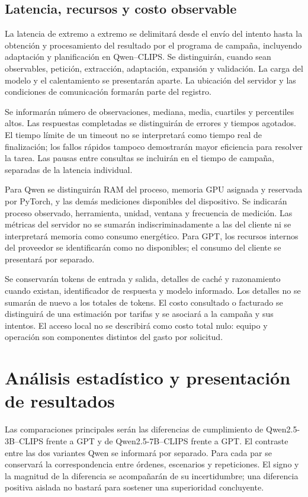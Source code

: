 \subsection{Latencia, recursos y costo observable}
\label{sec:rendimiento_cap6}

La latencia de extremo a extremo se delimitará desde el envío del intento
hasta la obtención y procesamiento del resultado por el programa de campaña,
incluyendo adaptación y planificación en Qwen--CLIPS. Se distinguirán,
cuando sean observables, petición, extracción, adaptación, expansión y
validación. La carga del modelo y el calentamiento se presentarán aparte.
La ubicación del servidor y las condiciones de comunicación formarán parte
del registro.

Se informarán número de observaciones, mediana, media, cuartiles y
percentiles altos. Las respuestas completadas se distinguirán de errores
y tiempos agotados. El tiempo límite de un timeout no se interpretará como
tiempo real de finalización; los fallos rápidos tampoco demostrarán mayor
eficiencia para resolver la tarea. Las pausas entre consultas se incluirán
en el tiempo de campaña, separadas de la latencia individual.

Para Qwen se distinguirán RAM del proceso, memoria GPU asignada y reservada
por PyTorch, y las demás mediciones disponibles del dispositivo. Se indicarán
proceso observado, herramienta, unidad, ventana y frecuencia de medición.
Las métricas del servidor no se sumarán indiscriminadamente a las del
cliente ni se interpretará memoria como consumo energético.
Para GPT, los recursos internos del proveedor se identificarán como no
disponibles; el consumo del cliente se presentará por separado.

Se conservarán tokens de entrada y salida, detalles de caché y razonamiento
cuando existan, identificador de respuesta y modelo informado. Los detalles
no se sumarán de nuevo a los totales de tokens. El costo consultado o
facturado se distinguirá de una estimación por tarifas y se asociará a la
campaña y sus intentos. El acceso local no se describirá como costo total
nulo: equipo y operación son componentes distintos del gasto por solicitud.

\section{Análisis estadístico y presentación de resultados}
\label{sec:analisis_estadistico_cap6}

Las comparaciones principales serán las diferencias de cumplimiento de
Qwen2.5-3B--CLIPS frente a GPT y de Qwen2.5-7B--CLIPS frente a GPT.
El contraste entre las dos variantes Qwen se informará por separado.
Para cada par se conservará la correspondencia entre órdenes, escenarios
y repeticiones. El signo y la magnitud de la diferencia se acompañarán
de su incertidumbre; una diferencia positiva aislada no bastará para
sostener una superioridad concluyente.

